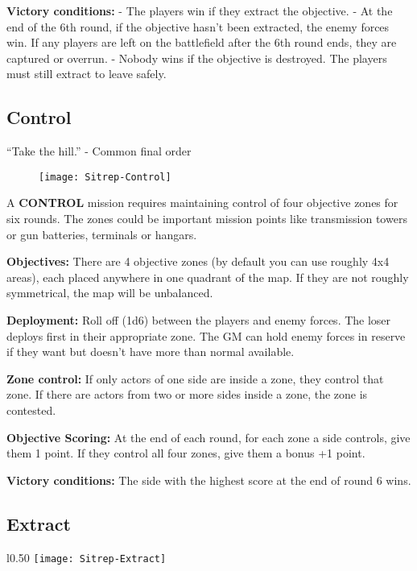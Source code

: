  \textbf{Victory conditions:}
 - The players win if they extract the objective.
 - At the end of the 6th round, if the objective hasn't been extracted, the enemy forces win. If any players are left on the battlefield after the 6th round ends, they are captured or overrun.
 - Nobody wins if the objective is destroyed. The players must still extract to leave safely.
 \newpage
 \subsection{Control}

 ``Take the hill.'' - Common final order

 \begin{figure}\begin{center}
   \texttt{[image: Sitrep-Control]}
 \end{center}\end{figure}

 A \textbf{CONTROL} mission requires maintaining control of four objective zones for six rounds. The zones could be important mission points like transmission towers or gun batteries, terminals or hangars.

 \textbf{Objectives:} There are 4 objective zones (by default you can use roughly 4x4 areas), each placed anywhere in one quadrant of the map. If they are not roughly symmetrical, the map will be unbalanced.

 \textbf{Deployment:} Roll off (1d6) between the players and enemy forces. The loser deploys first in their appropriate zone. The GM can hold enemy forces in reserve if they want but doesn't have more than normal available.

 \textbf{Zone control:} If only actors of one side are inside a zone, they control that zone. If there are actors from two or more sides inside a zone, the zone is contested.

 \textbf{Objective Scoring:} At the end of each round, for each zone a side controls, give them 1 point. If they control all four zones, give them a bonus +1 point.

 \textbf{Victory conditions:} The side with the highest score at the end of round 6 wins.

 \newpage
 \subsection{Extract}

 \begin{wrapfigure}{l}{0.50\textwidth}
   \centering
   \texttt{[image: Sitrep-Extract]}
 \end{wrapfigure}

